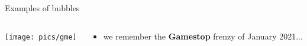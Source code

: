 \documentclass[english,10pt
,aspectratio=169
]{beamer}
\begin{document}


\begin{frame}[handout:0]{Examples of bubbles}
\begin{columns}
	\begin{column}{0.7\linewidth}
		\center
		\texttt{[image: pics/gme]}
	\end{column}
	\begin{column}{0.3\linewidth}
		\begin{itemize}
			\item we remember the \textbf{Gamestop} frenzy of January 2021...
		\end{itemize}
	\end{column}
\end{columns}
\end{frame}
\end{document}
